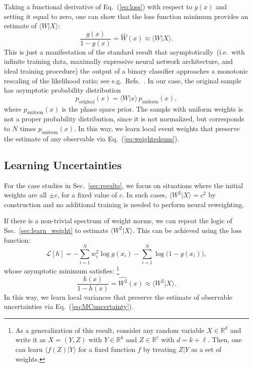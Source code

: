 \documentclass[prd,twocolumn,superscriptaddress,longbibliography,preprintnumbers,floatfix,nofootinbib]{revtex4-1}
\DeclareRobustCommand{\Sec}[1]{Sec.~\ref{sec:#1}}
\DeclareRobustCommand{\Eq}[1]{Eq.~(\ref{eq:#1})}
\DeclareRobustCommand{\Refs}[1]{Refs.~\cite{#1}}
\begin{document}
Taking a functional derivative of \Eq{loss} with respect to $g(x)$ and setting it equal to zero, one can show that the loss function minimum provides an estimate of $\langle W|X\rangle$:
%
\begin{equation}
\label{eq:learned_w_given_x}
\frac{g(x)}{1-g(x)} = \widehat{W}(x) \approx \langle W|X\rangle.
\end{equation}
%
This is just a manifestation of the standard result that asymptotically~(i.e.\ with infinite training data, maximally expressive neural network architecture, and ideal training procedure) the output of a binary classifier approaches a monotonic rescaling of the likelihood ratio; see e.g.~\Refs{Cranmer:2015bka,Brehmer:2018eca,Brehmer:2018kdj,Brehmer:2018hga,Stoye:2018ovl,Andreassen:2019nnm,Brehmer:2019xox,Andreassen:2019cjw,Andreassen:2020nkr,Hollingsworth:2020kjg,Badiali:2020wal}.
%
In our case, the original sample has asymptotic probability distribution
%
\begin{equation}
    p_\text{original}(x) = \langle W|x\rangle \, p_\text{uniform}(x),
\end{equation}
%
where $p_\text{uniform}(x)$ is the phase space prior.
%
The sample with uniform weights is not a proper probability distribution, since it is not normalized, but corresponds to $N$ times $p_\text{uniform}(x)$.
%
In this way, we learn local event weights that preserve the estimate of any observable via \Eq{weightedsum}. 


\subsection{Learning Uncertainties}

For the case studies in \Sec{results}, we focus on situations where the initial weights are all $\pm c$, for a fixed value of $c$.
%
In such cases, $\langle W^2|X\rangle=c^2$ by construction and no additional training is needed to perform neural reweighting.


If there is a non-trivial spectrum of weight norms, we can repeat the logic of \Sec{learn_weight} to estimate $\langle W^2|X\rangle$.
%
This can be achieved using the loss function:
%
\begin{equation}
\label{eq:loss2}
\mathcal{L}[h] = -\sum_{i=1}^N w_i^2 \log g(x_i) - \sum_{i=1}^N \log\big(1-g(x_i)\big),
\end{equation}
%
whose asymptotic minimum satisfies:%
%
\footnote{As a generalization of this result, consider any random variable $X\in\mathbb{R}^d$ and write it as $X=(Y,Z)$ with $Y\in\mathbb{R}^k$ and $Z\in\mathbb{R}^\ell$ with $d=k+\ell$.  Then, one can learn $\langle f(Z)|Y\rangle$ for a fixed function $f$ by treating $Z|Y$ as a set of weights.}
%
\begin{equation}
\label{eq:learned_w2_given_x}
\frac{h(x)}{1-h(x)} = \widehat{W^2}(x) \approx \langle W^2|X\rangle.
\end{equation}
%
In this way, we learn local variances that preserve the estimate of observable uncertainties via \Eq{MCuncertainty}. 
\end{document}
